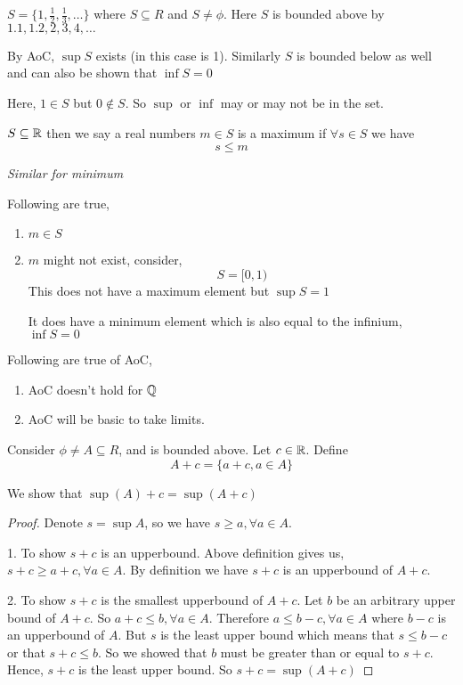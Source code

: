 \begin{eg}
    $S = \{1, \frac{1}{2}, \frac{1}{3}, \dots\}$ where $S \subseteq R$ and  $S \ne \phi$. Here $S$ is bounded above by  $1.1,1.2, 2,3,4,\dots$

    By AoC, $\sup S$ exists (in this case is 1). Similarly $S$ is bounded below as well and can also be shown that $\inf S = 0$
\end{eg}

\begin{note}
    Here, $1 \in S$ but  $0 \not \in S$. So  $\sup $ or  $\inf$ may or may not be in the set.
\end{note}

\begin{definition}
    $S \subseteq \mathbb{R}$ then we say a real numbers  $m \in S$ is a maximum if $\forall s \in S$ we have  $$s \le m$$
\end{definition}
\textit{Similar for minimum}
\begin{note}
    Following are true,

    \begin{enumerate}
        \item $m \in S$
        \item $m$ might not exist, consider, 
            $$ S = [0, 1) $$ 
This does not have a maximum element but $\sup S = 1$

It does have a minimum element which is also equal to the infinium, $\inf S = 0$ 
    \end{enumerate}
\end{note}


\begin{note}
    Following are true of AoC,

    \begin{enumerate}
        \item AoC doesn't hold for $\mathbb{Q}$
        \item AoC will be basic to take limits.
    \end{enumerate}
\end{note}
\begin{eg}
    Consider $ \phi \ne A \subseteq R$, and is bounded above. Let  $c \in \mathbb{R}$. Define  
    $$ A + c = \{a + c, a \in A\} $$ 

    We show that $\sup(A)  + c= \sup(A + c) $
\end{eg}
\begin{proof}
    Denote $s = \sup A$, so we have  $s \ge a, \forall a \in A$.  

    1. To show $s + c$ is an upperbound. Above definition gives us,  $s + c \ge a + c, \forall a \in A$. By definition we have  $s + c$ is an upperbound of  $A + c$. 

    2. To show $s + c$ is the smallest upperbound of  $A + c$. Let $b$ be an arbitrary upper bound of $A + c$. So  $ a + c \le b, \forall a \in A$. Therefore $a \le b - c, \forall a \in A$ where  $b - c$ is an upperbound of  $A$. But $s$ is the least upper bound which means that $s \le b - c$ or that  $s + c \le b$. So we showed that  $b$ must be greater than or equal to $s + c$. Hence, $s + c$ is the least upper bound.
    So  $s + c = \sup(A + c)$
\end{proof}

